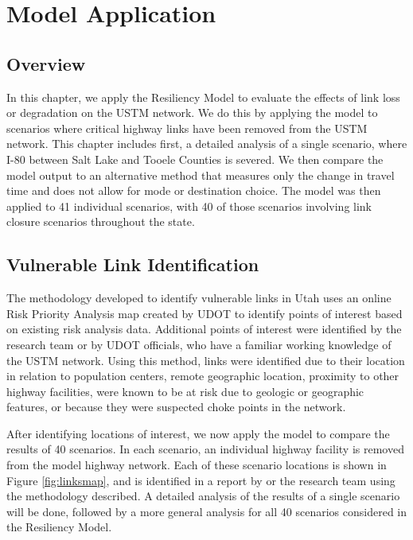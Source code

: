 \chapter{Model Application}
\label{chp:chapter4}
\graphicspath{{figures/}{figures/chapter4/}}

\section{Overview}
In this chapter, we apply the Resiliency Model to evaluate the effects of link
loss or degradation on the USTM network. We do this by applying the model to scenarios
where critical highway links have been removed from the USTM network. This
chapter includes first, a detailed analysis of a single scenario, where I-80
between Salt Lake and Tooele Counties is severed. We then compare the model
output to an alternative method that measures only the change in travel
time and does not allow for mode or destination choice. The model was then
applied to 41 individual scenarios, with 40 of those scenarios involving link
closure scenarios throughout the state.

\section{Vulnerable Link Identification}
The methodology developed to identify vulnerable links in Utah uses an online Risk Priority Analysis map created by UDOT to identify points of interest based on existing risk analysis data. Additional
points of interest were identified by the research team or by UDOT officials, who have a familiar working knowledge of the USTM network. Using this
method, links were identified due to their location in relation to
population centers, remote geographic location, proximity to other highway facilities, were known to be at risk due to geologic or geographic features, or
because they were suspected choke points in the network.

After identifying locations of interest, we now apply the model to compare the results of 40 scenarios. In each scenario, an individual highway
facility is removed from the model highway network. Each of these scenario locations is shown in Figure \ref{fig:linksmap}, and is identified in a report by
\cite{aem2017} or the research team using the methodology described. A detailed analysis of the results of a single scenario will be done, followed by a
more general analysis for all 40 scenarios considered in the Resiliency Model.

